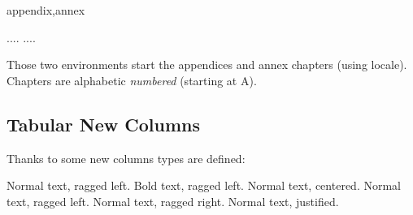 \documentclass[dctools,english]{ufrgscca} %
\begin{document}
\begin{Envs}{appendix,annex}
	\begin{Syntax}%
		\Macro{\begin{appendix}}{}.... \Macro{\end{appendix}}{}
		\Macro{\begin{annex}}{}.... \Macro{\end{annex}}{}
	\end{Syntax}
\end{Envs}
Those two environments start the appendices and annex chapters (using locale). Chapters are  alphabetic \emph{numbered} (starting at A).
\subsection{Tabular New Columns}
Thanks to  some new columns types are defined:
\begin{Values}
	  Normal text, ragged left.
	  Bold text, ragged left.
	  Normal text, centered.
	  Normal text, ragged left.
	  Normal text, ragged right.
	  Normal text, justified.

	\end{Values}
\end{document}
